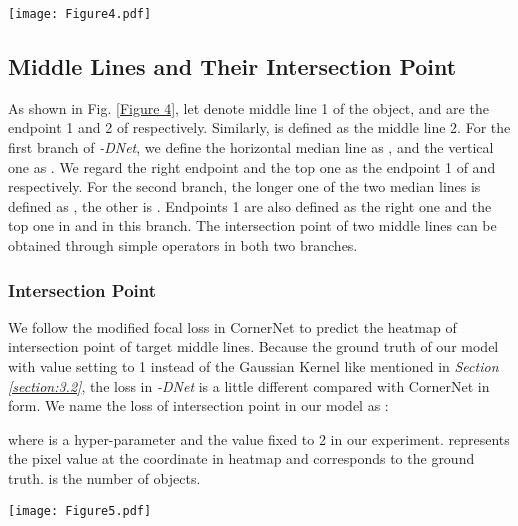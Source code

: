 \documentclass[runningheads]{llncs}
\begin{document}
\begin{figure*}[!t]
	\centering
	\texttt{[image: Figure4.pdf]}
\caption{The definition of two middle lines and the order of two endpoints of per middle line. The first line of figures represent objects with angles of 90 degree, and the second line of figures represent oriented objects with another angles.} 
	\label{Figure 4}
\end{figure*}

\subsection{Middle Lines and Their Intersection Point} \label{section:3.3}

As shown in Fig. \ref{Figure 4}, let  denote middle line 1 of the object,  and  are the endpoint 1 and 2 of  respectively. Similarly,  is defined as the middle line 2. For the first branch of \textit{-DNet}, we define the horizontal median line as , and the vertical one as . We regard the right endpoint and the top one as the endpoint 1 of  and  respectively. For the second branch, the longer one of the two median lines is defined as , the other is . Endpoints 1 are also defined as the right one and the top one in  and  in this branch. The intersection point  of two middle lines can be obtained through simple operators  in both two branches.

\subsubsection{Intersection Point}

We follow the modified focal loss\cite{lin2017focal} in CornerNet\cite{law2018cornernet} to predict the heatmap of intersection point of target middle lines. Because the ground truth of our model with value setting to 1 instead of the Gaussian Kernel like mentioned in {\color{red}\textit{Section \ref{section:3.2}}}, the loss in \textit{-DNet} is a little different compared with CornerNet in form. We name the loss of intersection point in our model as :


where  is a hyper-parameter and the value fixed to 2 in our experiment.  represents the pixel value at the coordinate  in heatmap and  corresponds to the ground truth.  is the number of objects.


\begin{figure*}[!t]
	\centering
	\texttt{[image: Figure5.pdf]}
\caption{The method of regressing middle lines in our model. The relative distance between endpoint and intersection point is represented as  xi,  yi, where i is 1,2,3,4 meaning the four corresponding endpoints of middle lines.} 
	\label{Figure 5}
\end{figure*}
\end{document}
